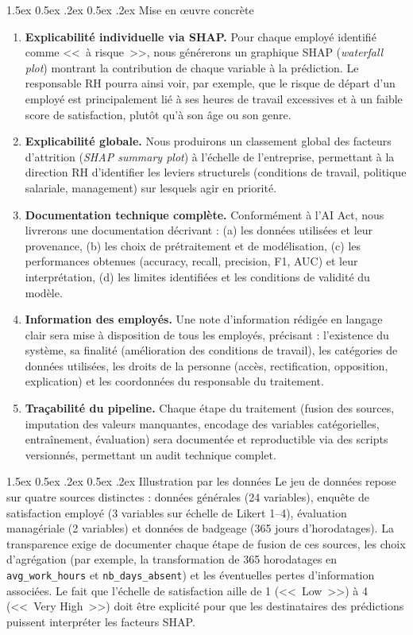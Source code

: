 \documentclass[12pt,a4paper]{article}
\makeatletter
\renewcommand\paragraph{\@startsection{paragraph}{4}{\z@}%
  {1.5ex \@plus 0.5ex \@minus .2ex}%
  {0.5ex \@plus .2ex}%
  {\normalfont\normalsize\bfseries}}
\makeatother
\begin{document}
\paragraph{Mise en \oe uvre concrète}
\begin{enumerate}
    \item \textbf{Explicabilité individuelle via SHAP.} Pour chaque employé identifié comme <<~à risque~>>, nous générerons un graphique SHAP (\textit{waterfall plot}) montrant la contribution de chaque variable à la prédiction. Le responsable RH pourra ainsi voir, par exemple, que le risque de départ d'un employé est principalement lié à ses heures de travail excessives et à un faible score de satisfaction, plutôt qu'à son âge ou son genre.
    \item \textbf{Explicabilité globale.} Nous produirons un classement global des facteurs d'attrition (\textit{SHAP summary plot}) à l'échelle de l'entreprise, permettant à la direction RH d'identifier les leviers structurels (conditions de travail, politique salariale, management) sur lesquels agir en priorité.
    \item \textbf{Documentation technique complète.} Conformément à l'AI Act, nous livrerons une documentation décrivant : (a) les données utilisées et leur provenance, (b) les choix de prétraitement et de modélisation, (c) les performances obtenues (accuracy, recall, precision, F1, AUC) et leur interprétation, (d) les limites identifiées et les conditions de validité du modèle.
    \item \textbf{Information des employés.} Une note d'information rédigée en langage clair sera mise à disposition de tous les employés, précisant : l'existence du système, sa finalité (amélioration des conditions de travail), les catégories de données utilisées, les droits de la personne (accès, rectification, opposition, explication) et les coordonnées du responsable du traitement.
    \item \textbf{Traçabilité du pipeline.} Chaque étape du traitement (fusion des sources, imputation des valeurs manquantes, encodage des variables catégorielles, entraînement, évaluation) sera documentée et reproductible via des scripts versionnés, permettant un audit technique complet.
\end{enumerate}

\paragraph{Illustration par les données}
Le jeu de données repose sur quatre sources distinctes : données générales (24 variables), enquête de satisfaction employé (3 variables sur échelle de Likert 1--4), évaluation managériale (2 variables) et données de badgeage (365 jours d'horodatages). La transparence exige de documenter chaque étape de fusion de ces sources, les choix d'agrégation (par exemple, la transformation de 365 horodatages en \texttt{avg\_work\_hours} et \texttt{nb\_days\_absent}) et les éventuelles pertes d'information associées. Le fait que l'échelle de satisfaction aille de 1 (<<~Low~>>) à 4 (<<~Very High~>>) doit être explicité pour que les destinataires des prédictions puissent interpréter les facteurs SHAP.
\end{document}
